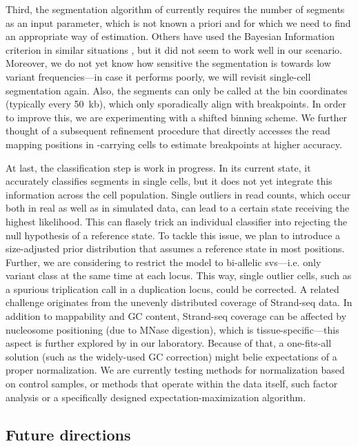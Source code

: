 Third, the segmentation algorithm of \mc currently requires the number of segments as an
input parameter, which is not known a priori and for which we need to find an
appropriate way of estimation.  Others have used the Bayesian Information
criterion in similar situations \citep{Huber2006}, but it did not seem to work well
in our scenario. Moreover, we do not yet know how sensitive the segmentation is
towards low variant frequencies---in case it performs poorly, we will revisit
single-cell segmentation again. Also, the segments can only be called at the bin
coordinates (typically every 50~kb), which only sporadically align with \sv
breakpoints. In order to improve this, we are experimenting with a shifted
binning scheme. We further thought of a subsequent refinement procedure that
directly accesses the read mapping positions in \sv-carrying cells to estimate
breakpoints at higher accuracy.

At last, the classification step is work in progress. In its current state, it
accurately classifies segments in single cells, but it does not yet integrate
this information across the cell population. Single outliers in read counts,
which occur both in real as well as in simulated data, can lead to a certain
\sv state receiving the highest likelihood. This can flasely trick an individual
classifier into rejecting the null hypothesis of a reference state.
To tackle this issue, we plan to introduce a size-adjusted prior distribution that
assumes a reference state in most positions.
Further, we are considering to restrict the model to bi-allelic \acp{sv}---i.e.
only variant class at the same time at each locus. This way, single outlier
cells, such as a spurious triplication call in a duplication locus, could be
corrected. A related challenge originates from the unevenly distributed coverage
of Strand-seq data. In addition to mappability and GC content, Strand-seq
coverage can be affected by nucleosome positioning (due to MNase digestion),
which is tissue-specific---this aspect is further explored by \hyobin in our
laboratory. Because of that, a one-fits-all solution (such as the widely-used GC
correction) might belie expectations of a proper normalization. We are currently
testing methods for normalization based on control samples, or methods that operate within the data
itself, such factor analysis \citep{Stegle2012} or a specifically
designed expectation-maximization algorithm.



\subsection{Future directions}
\label{sec:mosaic_outlook}

